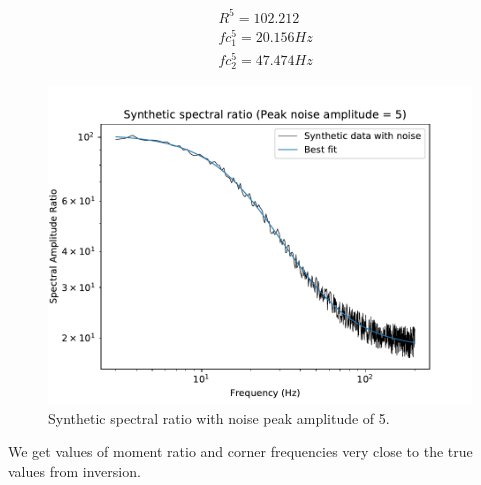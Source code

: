 \documentclass[11pt]{article}
\begin{document}
\begin{align*}
    &R^5 = 102.212 \\
    &fc_1^5 = 20.156 Hz \\
    &fc_2^5 = 47.474 Hz
\end{align*}
\begin{figure}[!htb]
    \centering
    \includegraphics[scale=0.7]{fig_noise_2.pdf}
    \caption{Synthetic spectral ratio with noise peak amplitude of 5.}
\end{figure}

We get values of moment ratio and corner frequencies very close to the true values from inversion.
\end{document}
